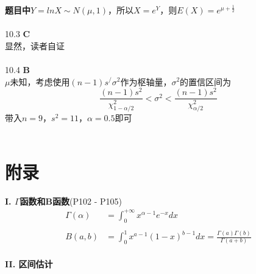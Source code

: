 \documentclass[a4paper]{ctexart}    %
\begin{document}
	\textbf{题目中}$ Y = lnX \sim N(\mu, 1) $，所以$ X = e^{Y} $，则$ E(X) = e^{\mu + \frac{1}{2}} $
	\\ \\
	10.3 \quad \textbf{C} \\
	显然，读者自证 \\ \\
	10.4 \quad \textbf{B} \\
	$ \mu $未知，考虑使用$ (n-1)s^/\sigma^2 $作为枢轴量，$\sigma^2$的置信区间为
	\begin{equation*}
		\frac{(n-1)s^2}{\chi_{1-\alpha/2}^{2}}< \sigma^2 < \frac{(n-1)s^2}{\chi_{\alpha/2}^{2}}
	\end{equation*}
	带入$ n = 9 $，$ s^2 = 11 $，$ \alpha = 0.5 $即可 \\
	\\
	\newpage
	\section{附录}
	\noindent
	\textbf{\large I. $ \Gamma $函数和B函数}(P102 - P105) \\
	\begin{equation*}
		\begin{split}
			\Gamma(\alpha) &= \int_{0}^{+\infty} x^{\alpha - 1}e^{-x}dx \\
			& \\
			B(a, b) &= \int_{0}^{1} x^{a-1}(1-x)^{b-1}dx = \frac{\Gamma(a)\Gamma(b)}{\Gamma(a+b)}
		\end{split}
	\end{equation*} \\
	\textbf{\large II. 区间估计}
\end{document}
